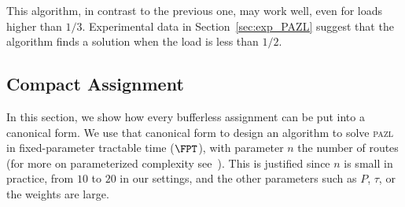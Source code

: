 \documentclass[a4paper,10pt]{journal}
\newcommand\pazl{\textsc{pazl}\xspace}
\begin{document}
This algorithm, in contrast to the previous one, may work well, even for loads higher than $1/3$.
Experimental data in Section~\ref{sec:exp_PAZL} suggest that the algorithm finds a solution when the load is less than $1/2$.


\subsection{Compact Assignment}

In this section, we show how every bufferless assignment can be put into a canonical form.
We use that canonical form to design an algorithm to solve \pazl in fixed-parameter tractable time ($\FPT$), with parameter $n$ the number of routes (for more on parameterized complexity see~\cite{downey2012parameterized}). This is justified since $n$ is small in practice, from $10$ to $20$ in our settings, and the other parameters such as $P$, $\tau$, or the weights are large.
\end{document}
